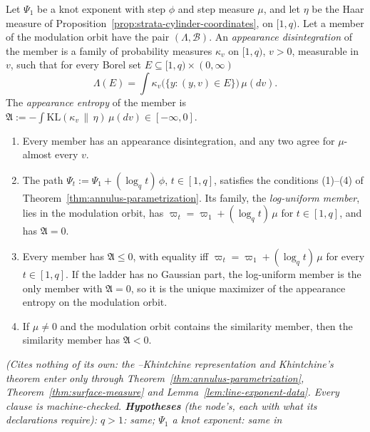 \begin{proposition}
\label{prop:appearance-entropy}
\leanok
{}
Let $\Psi_1$ be a knot exponent with step $\phi$ and step measure $\mu$, and let $\eta$ be the Haar
measure of Proposition~\ref{prop:strata-cylinder-coordinates}, on $[1,q)$. Let a member of the
modulation orbit have the pair $(\Lambda, \mathcal{B})$. An \emph{appearance disintegration} of the
member is a family of probability measures $\kappa_v$ on $[1,q)$, $v > 0$, measurable in $v$, such
that for every Borel set $E \subseteq [1,q) \times (0,\infty)$
\[
  \Lambda(E) = \int\kappa_v\bigl(\{y : (y, v) \in E\}\bigr)\,\mu(dv) .
\]
The \emph{appearance entropy} of the member is
$\mathfrak{A} := -\int\mathrm{KL}(\kappa_v \,\|\, \eta)\,\mu(dv) \in [-\infty, 0]$.
\begin{enumerate}
\item Every member has an appearance disintegration, and any two agree for $\mu$-almost every $v$.
\item The path $\Psi_t := \Psi_1 + (\log_qt)\,\phi$, $t \in [1,q]$, satisfies the conditions
(1)--(4) of Theorem~\ref{thm:annulus-parametrization}. Its family, the \emph{log-uniform member},
lies in the modulation orbit, has $\varpi_t = \varpi_1 + (\log_qt)\,\mu$ for $t \in [1,q]$, and has
$\mathfrak{A} = 0$.
\item Every member has $\mathfrak{A} \le 0$, with equality iff
$\varpi_t = \varpi_1 + (\log_qt)\,\mu$ for every $t \in [1,q]$. If the ladder has no Gaussian
part, the log-uniform member is the only member with $\mathfrak{A} = 0$, so it is the unique
maximizer of the appearance entropy on the modulation orbit.
\item If $\mu \ne 0$ and the modulation orbit contains the similarity member, then the similarity
member has $\mathfrak{A} < 0$.
\end{enumerate}
\statusT\quad\emph{(Cites nothing of its own: the \Levy{}--Khintchine representation and
Khintchine's theorem enter only through
Theorem~\ref{thm:annulus-parametrization}, Theorem~\ref{thm:surface-measure} and
Lemma~\ref{lem:line-exponent-data}. Every clause is machine-checked. \textbf{Hypotheses} (the
node's, each with what its declarations require): $q > 1$: same; $\Psi_1$ a knot exponent: same in
}
\end{proposition}

